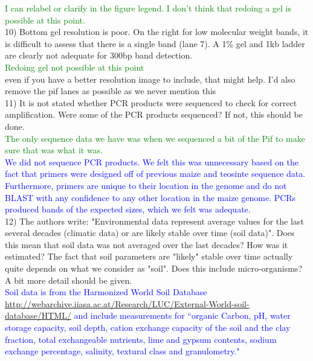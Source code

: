 \documentclass[11pt]{article}
\newcommand{\res}[1]{\noindent \textcolor{blue}{{#1}} \\}
\newcommand{\lev}[1]{\noindent \textcolor{green}{{#1}} \\}
\newcommand{\mbh}[1]{\noindent \textcolor{Dandelion}{{#1}}\\}
\begin{document}
\lev{I can relabel or clarify in the figure legend. I don't think that redoing a gel is possible at this point.}

10) Bottom gel resolution is poor. On the right for low molecular weight bands, it is difficult to assess that there is a single band (lane 7). A 1\% gel and 1kb ladder are clearly not adequate for 300bp band detection.\\

\lev{Redoing gel not possible at this point}

\mbh{even if you have a better resolution image to include, that might help.  I'd also remove the pif lanes as possible as we never mention this}

11) It is not stated whether PCR products were sequenced to check for correct amplification. Were some of the PCR products sequenced? If not, this should be done.\\

\lev{The only sequence data we have was when we sequenced a bit of the Pif to make sure that was what it was.}

\res{We did not sequence PCR products. We felt this was unnecessary based on the fact that primers were designed off of previous maize and teosinte sequence data. Furthermore, primers are unique to their location in the genome and do not BLAST with any confidence to any other location in the maize genome. PCRs produced bands of the expected sizes, which we felt was adequate.}

12) The authors write: "Environmental data represent average values for the last several decades (climatic data) or are likely stable over time (soil data)". Does this mean that soil data was not averaged over the last decades? How was it estimated? The fact that soil parameters are "likely" stable over time actually quite depends on what we consider as "soil". Does this include micro-organisms? A bit more detail should be given.\\

\res{Soil data is from the Harmonized World Soil Database \url{http://webarchive.iiasa.ac.at/Research/LUC/External-World-soil-database/HTML/} and include measurements for ``organic Carbon, pH, water storage capacity, soil depth, cation exchange capacity of the soil and the clay fraction, total exchangeable nutrients, lime and gypsum contents, sodium exchange percentage, salinity, textural class and granulometry."}
\end{document}
